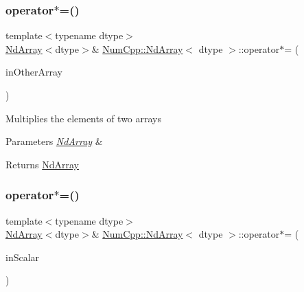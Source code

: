 \subsubsection{\texorpdfstring{operator$\ast$=()}{operator*=()}\hspace{0.1cm}{\footnotesize\ttfamily [1/2]}}
{\footnotesize\ttfamily template$<$typename dtype$>$ \\
\mbox{\hyperlink{class_num_cpp_1_1_nd_array}{Nd\+Array}}$<$dtype$>$\& \mbox{\hyperlink{class_num_cpp_1_1_nd_array}{Num\+Cpp\+::\+Nd\+Array}}$<$ dtype $>$\+::operator$\ast$= (\begin{DoxyParamCaption}\item[{const \mbox{\hyperlink{class_num_cpp_1_1_nd_array}{Nd\+Array}}$<$ dtype $>$ \&}]{in\+Other\+Array }\end{DoxyParamCaption})\hspace{0.3cm}{\ttfamily [inline]}}

Multiplies the elements of two arrays


\begin{DoxyParams}{Parameters}
{\em \mbox{\hyperlink{class_num_cpp_1_1_nd_array}{Nd\+Array}}} & \\
\hline
\end{DoxyParams}
\begin{DoxyReturn}{Returns}
\mbox{\hyperlink{class_num_cpp_1_1_nd_array}{Nd\+Array}} 
\end{DoxyReturn}
\mbox{\label{class_num_cpp_1_1_nd_array_a7e3a903716269b996fb7d44cc96ce23f}} 
\subsubsection{\texorpdfstring{operator$\ast$=()}{operator*=()}\hspace{0.1cm}{\footnotesize\ttfamily [2/2]}}
{\footnotesize\ttfamily template$<$typename dtype$>$ \\
\mbox{\hyperlink{class_num_cpp_1_1_nd_array}{Nd\+Array}}$<$dtype$>$\& \mbox{\hyperlink{class_num_cpp_1_1_nd_array}{Num\+Cpp\+::\+Nd\+Array}}$<$ dtype $>$\+::operator$\ast$= (\begin{DoxyParamCaption}\item[{dtype}]{in\+Scalar }\end{DoxyParamCaption})\hspace{0.3cm}{\ttfamily [inline]}}

